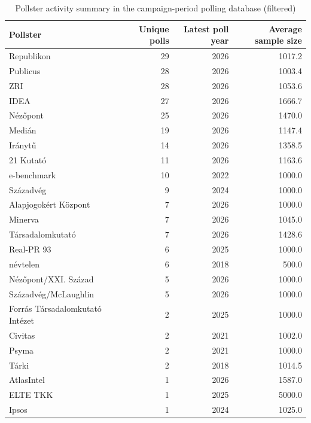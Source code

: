 \begin{table}
\caption{Pollster activity summary in the campaign-period polling database (filtered)}
\label{tab:pollster_activity_summary_filtered}
\begin{tabular}{lrrr}
\toprule
Pollster & Unique polls & Latest poll year & Average sample size \\
\midrule
Republikon & 29 & 2026 & 1017.2 \\
Publicus & 28 & 2026 & 1003.4 \\
ZRI & 28 & 2026 & 1053.6 \\
IDEA & 27 & 2026 & 1666.7 \\
Nézőpont & 25 & 2026 & 1470.0 \\
Medián & 19 & 2026 & 1147.4 \\
Iránytű & 14 & 2026 & 1358.5 \\
21 Kutató & 11 & 2026 & 1163.6 \\
e-benchmark & 10 & 2022 & 1000.0 \\
Századvég & 9 & 2024 & 1000.0 \\
Alapjogokért Központ & 7 & 2026 & 1000.0 \\
Minerva & 7 & 2026 & 1045.0 \\
Társadalomkutató & 7 & 2026 & 1428.6 \\
Real-PR 93 & 6 & 2025 & 1000.0 \\
névtelen & 6 & 2018 & 500.0 \\
Nézőpont/XXI. Század & 5 & 2026 & 1000.0 \\
Századvég/McLaughlin & 5 & 2026 & 1000.0 \\
Forrás Társadalomkutató Intézet & 2 & 2025 & 1000.0 \\
Civitas & 2 & 2021 & 1002.0 \\
Psyma & 2 & 2021 & 1000.0 \\
Tárki & 2 & 2018 & 1014.5 \\
AtlasIntel & 1 & 2026 & 1587.0 \\
ELTE TKK & 1 & 2025 & 5000.0 \\
Ipsos & 1 & 2024 & 1025.0 \\
\bottomrule
\end{tabular}
\end{table}
